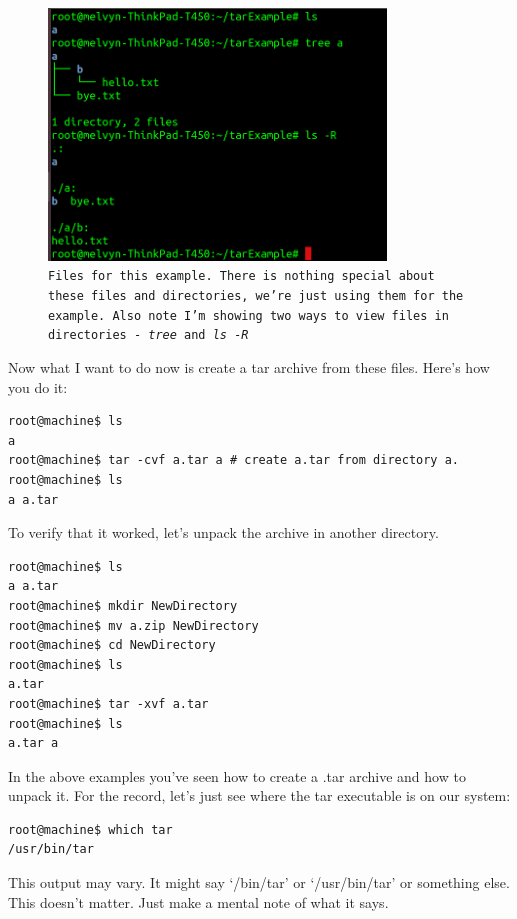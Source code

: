 \documentclass[12pt,a4paper]{article}
\begin{document}
\begin{figure}[h]
\centering
	\includegraphics[width=0.8\textwidth]{Images/tarExample1.png}
	\caption{{\small \texttt{Files for this example. There is nothing special about these files
and directories, we're just using them for the example. Also note I'm showing
two ways to view files in directories - \textit{tree} and \textit{ ls -R}}}}
	\label{fig:tarExample1}
\end{figure}


Now what I want to do now is create a tar archive from these files. Here's how
you do it:

\begin{lstlisting}[style=term]
root@machine$ ls
a
root@machine$ tar -cvf a.tar a # create a.tar from directory a. 
root@machine$ ls 
a a.tar
\end{lstlisting}

To verify that it worked, let's unpack the archive in another directory.

\begin{lstlisting}[style=term]
root@machine$ ls
a a.tar
root@machine$ mkdir NewDirectory
root@machine$ mv a.zip NewDirectory
root@machine$ cd NewDirectory
root@machine$ ls
a.tar
root@machine$ tar -xvf a.tar
root@machine$ ls
a.tar a 
\end{lstlisting}

In the above examples you've seen how to create a .tar archive and how to unpack
it. For the record, let's just see where the tar executable is on our system:

\begin{lstlisting}[style=term]
root@machine$ which tar
/usr/bin/tar
\end{lstlisting}

This output may vary. It might say `/bin/tar' or `/usr/bin/tar' or something
else. This doesn't matter. Just make a mental note of what it says.
\end{document}
